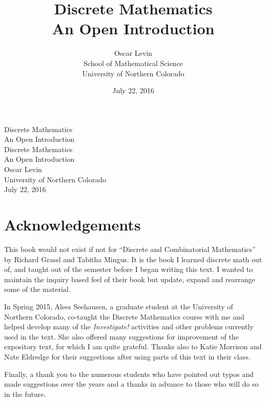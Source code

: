 \documentclass[10pt,]{book}
\title{Discrete Mathematics\\
{\large An Open Introduction}}
\author{Oscar Levin\\
School of Mathematical Science\\
University of Northern Colorado
}
\date{July 22, 2016}
\theoremstyle{plain}
\theoremstyle{definition}
\theoremstyle{definition}
\theoremstyle{definition}
\begin{document}
\frontmatter
\thispagestyle{empty}
{\centering
\vspace*{0.28\textheight}
{\Huge Discrete Mathematics}\\[2\baselineskip]
{\LARGE An Open Introduction}\\
}
\clearpage
\thispagestyle{empty}
\null%
\clearpage
\thispagestyle{empty}
{\centering
\vspace*{0.14\textheight}
{\Huge Discrete Mathematics}\\[\baselineskip]
{\LARGE An Open Introduction}\\[3\baselineskip]
{\Large Oscar Levin}\\[0.5\baselineskip]
{\Large University of Northern Colorado}\\[3\baselineskip]
{\Large July 22, 2016}\\}
\clearpage
\thispagestyle{empty}
\null\clearpage
\chapter*{Acknowledgements}\label{acknowledgement-1}

  This book would not exist if not for ``Discrete and Combinatorial Mathematics'' by Richard Grassl and Tabitha Mingus. It is the book I learned discrete math out of, and taught out of the semester before I began writing this text. I wanted to maintain the inquiry based feel of their book but update, expand and rearrange some of the material.
\par

  In Spring 2015, Alees Seehausen, a graduate student at the University of Northern Colorado, co-taught the Discrete Mathematics course with me and helped develop many of the \emph{Investigate!} activities and other problems currently used in the text. She also offered many suggestions for improvement of the expository text, for which I am quite grateful. Thanks also to Katie Morrison and Nate Eldredge for their suggestions after using parts of this text in their class.
\par

  Finally, a thank you to the numerous students who have pointed out typos and made suggestions over the years and a thanks in advance to those who will do so in the future.
\end{document}
